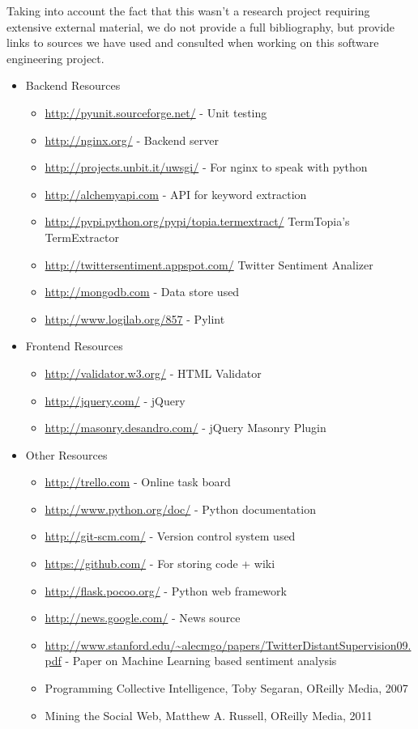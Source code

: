 \documentclass{report}
\begin{document}
	Taking into account the fact that this wasn't a research project requiring extensive external material, we do not provide a full bibliography, but provide links to sources we have used and consulted when working on this software engineering project.
	
	\begin{itemize}
		\item Backend Resources
		\begin{itemize}
			\item 	\url{http://pyunit.sourceforge.net/} - Unit testing
			\item 	\url{http://nginx.org/} - Backend server
			\item 	\url{http://projects.unbit.it/uwsgi/} - For nginx to speak with python
			\item 	\url{http://alchemyapi.com} - API for keyword extraction
			\item   \url{http://pypi.python.org/pypi/topia.termextract/} TermTopia's TermExtractor
			\item   \url{http://twittersentiment.appspot.com/} Twitter Sentiment Analizer
			\item 	\url{http://mongodb.com} - Data store used 
			\item 	\url{http://www.logilab.org/857} - Pylint
		\end{itemize}
		
		
		\item Frontend Resources
		\begin{itemize}
			\item 	\url{http://validator.w3.org/} - HTML Validator
			\item 	\url{http://jquery.com/} - jQuery
			\item 	\url{http://masonry.desandro.com/} - jQuery Masonry Plugin
		\end{itemize}
		
		\item Other Resources
		\begin{itemize}
			\item 	\url{http://trello.com} - Online task board
			\item 	\url{http://www.python.org/doc/} - Python documentation
			\item 	\url{http://git-scm.com/} - Version control system used
			\item 	\url{https://github.com/} - For storing code + wiki
			\item 	\url{http://flask.pocoo.org/} - Python web framework
			\item 	\url{http://news.google.com/} - News source
			\item   \url{http://www.stanford.edu/~alecmgo/papers/TwitterDistantSupervision09.pdf} - Paper on Machine Learning based sentiment analysis
			\item 	Programming Collective Intelligence, Toby Segaran, OReilly Media, 2007
			\item 	Mining the Social Web, Matthew A. Russell, OReilly Media, 2011
		\end{itemize}
		
	\end{itemize} 
	
\end{document}

